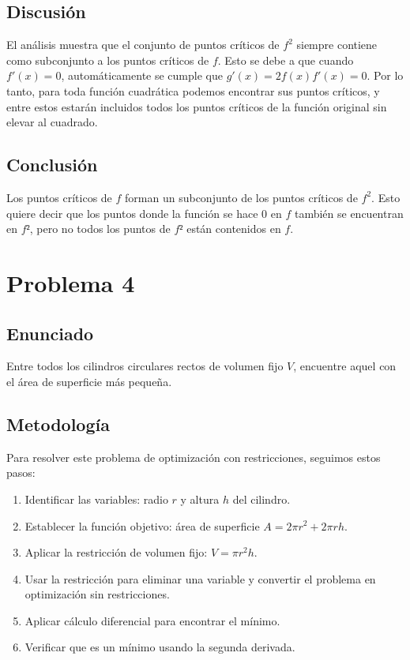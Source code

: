\documentclass{article}
\begin{document}
\subsection{Discusión}

El análisis muestra que el conjunto de puntos críticos de $f^2$ siempre contiene como subconjunto a los puntos críticos de $f$. Esto se debe a que cuando $f'(x) = 0$, automáticamente se cumple que $g'(x) = 2f(x)f'(x) = 0$.
Por lo tanto, para toda función cuadrática podemos encontrar sus puntos críticos, y entre estos estarán incluidos todos los puntos críticos de la función original sin elevar al cuadrado.

\subsection{Conclusión}

Los puntos críticos de $f$ forman un subconjunto de los puntos críticos de $f^2$. Esto quiere decir que los puntos donde la función se hace 0 en $f$ también se encuentran en $f²$, pero no todos los puntos de $f²$ están contenidos en $f$.

\section{Problema 4}

\subsection{Enunciado}
Entre todos los cilindros circulares rectos de volumen fijo $V$, encuentre aquel con el área de superficie más pequeña.

\subsection{Metodología}

Para resolver este problema de optimización con restricciones, seguimos estos pasos:
\begin{enumerate}
    \item Identificar las variables: radio $r$ y altura $h$ del cilindro.
    \item Establecer la función objetivo: área de superficie $A = 2\pi r^2 + 2\pi rh$.
    \item Aplicar la restricción de volumen fijo: $V = \pi r^2 h$.
    \item Usar la restricción para eliminar una variable y convertir el problema en optimización sin restricciones.
    \item Aplicar cálculo diferencial para encontrar el mínimo.
    \item Verificar que es un mínimo usando la segunda derivada.
\end{enumerate}
\end{document}

